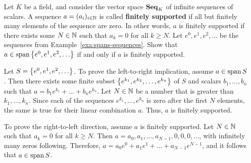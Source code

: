 \begin{ex}
  Let $K$ be a field, and consider the vector space $\mathbf{Seq}_K$ of
  infinite sequences of scalars.  A sequence $a=(a_i)_{i\in\mathbb{N}}$ is
  called \textbf{finitely supported}%
   if all but finitely many
  elements of the sequence are zero. In other words, $a$ is finitely
  supported if there exists some $N\in\mathbb{N}$ such that $a_k=0$ for all
  $k\geq N$.  Let $e^0,e^1,e^2,\ldots$ be the sequences from
  Example~\ref{exa:spans-sequences}.  Show that
  $a\in\sspan\set{e^0,e^1,e^2,\ldots}$ if and only if $a$ is finitely
  supported.
  \begin{sol}
    Let $S=\left\{e^0,e^1,e^2,\ldots\right\}$. To prove the left-to-right
    implication, assume $a\in\sspan S$. Then there exists some finite
    subset $\left\{e^{k_1},e^{k_2},\ldots,e^{k_n}\right\}$ of $S$ and scalars
    $b_1,\ldots,b_n$ such that $a = b_1e^{k_1} + \ldots + b_ne^{k_n}$.
    Let $N\in\mathbb{N}$ be a number that is greater than $k_1,\ldots,k_n$.
    Since each of the sequences $e^{k_1},\ldots,e^{k_n}$ is zero after
    the first $N$ elements, the same is true for their linear
    combination $a$. Thus, $a$ is finitely supported.

    To prove the right-to-left direction, assume $a$ is finitely
    supported. Let $N\in\mathbb{N}$ such that $a_k=0$ for all $k\geq N$.  Then
    $a = a_0,a_1,\ldots,a_{N-1},0,0,0,\ldots$, with infinitely many
    zeros following. Therefore,
    $a = a_0e^0 + a_1e^1 + \ldots + a_{N-1}e^{N-1}$, and it follows
    that $a\in\sspan S$.
  \end{sol}
\end{ex}

